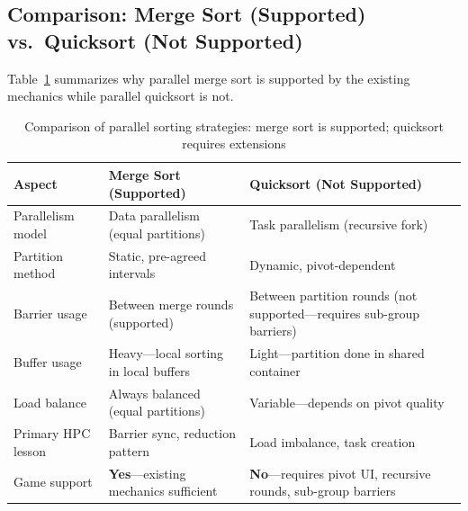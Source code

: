 \subsection{Comparison: Merge Sort (Supported) vs.\ Quicksort (Not Supported)}
\label{subsec:algo-mode-comparison}

Table~\ref{tab:algo-mode-comparison} summarizes why parallel merge sort is supported by the existing mechanics while parallel quicksort is not.

\begin{table}[htbp]
    \centering
    \caption{Comparison of parallel sorting strategies: merge sort is supported; quicksort requires extensions}
    \label{tab:algo-mode-comparison}
    \begin{tabular}{@{}p{3.8cm}p{5.2cm}p{5.2cm}@{}}
        \toprule
        \textbf{Aspect}    & \textbf{Merge Sort (Supported)}              & \textbf{Quicksort (Not Supported)}                                     \\
        \midrule
        Parallelism model  & Data parallelism (equal partitions)          & Task parallelism (recursive fork)                                      \\
        \midrule
        Partition method   & Static, pre-agreed intervals                 & Dynamic, pivot-dependent                                               \\
        \midrule
        Barrier usage      & Between merge rounds (supported)             & Between partition rounds (not supported---requires sub-group barriers) \\
        \midrule
        Buffer usage       & Heavy---local sorting in local buffers       & Light---partition done in shared container                             \\
        \midrule
        Load balance       & Always balanced (equal partitions)           & Variable---depends on pivot quality                                    \\
        \midrule
        Primary HPC lesson & Barrier sync, reduction pattern              & Load imbalance, task creation                                          \\
        \midrule
        Game support       & \textbf{Yes}---existing mechanics sufficient & \textbf{No}---requires pivot UI, recursive rounds, sub-group barriers  \\
        \bottomrule
    \end{tabular}
\end{table}

